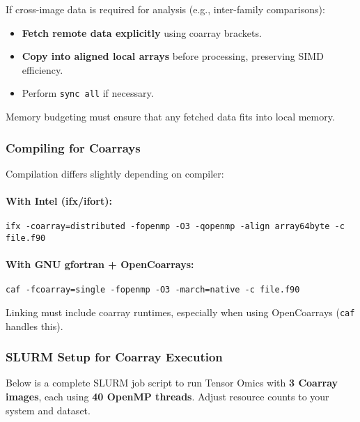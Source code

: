 \documentclass{article}
\begin{document}
If cross-image data is required for analysis (e.g., inter-family comparisons):
\begin{itemize}
\item \textbf{Fetch remote data explicitly} using coarray brackets.
\item \textbf{Copy into aligned local arrays} before processing, preserving SIMD efficiency.
\item Perform \texttt{sync all} if necessary.
\end{itemize}

Memory budgeting must ensure that any fetched data fits into local memory.

\subsubsection{Compiling for Coarrays}
Compilation differs slightly depending on compiler:

\paragraph{With Intel (ifx/ifort):}
\begin{verbatim}
ifx -coarray=distributed -fopenmp -O3 -qopenmp -align array64byte -c file.f90
\end{verbatim}

\paragraph{With GNU gfortran + OpenCoarrays:}
\begin{verbatim}
caf -fcoarray=single -fopenmp -O3 -march=native -c file.f90
\end{verbatim}

Linking must include coarray runtimes, especially when using OpenCoarrays (\texttt{caf} handles this).

\subsubsection{SLURM Setup for Coarray Execution}

Below is a complete SLURM job script to run Tensor Omics with \textbf{3 Coarray images}, each using \textbf{40 OpenMP threads}. Adjust resource counts to your system and dataset.
\end{document}
